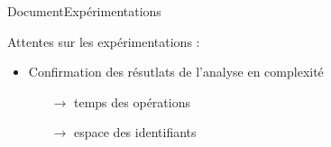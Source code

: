 \begin{frame}{Document}{Expérimentations}

  Attentes sur les expérimentations : 
  \begin{itemize}
  \item Confirmation des résutlats de l'analyse en complexité
    \begin{itemize}
    \item [$\rightarrow$] temps des opérations
    \item [$\rightarrow$] espace des identifiants
    \end{itemize}
  \end{itemize}

\end{frame}



